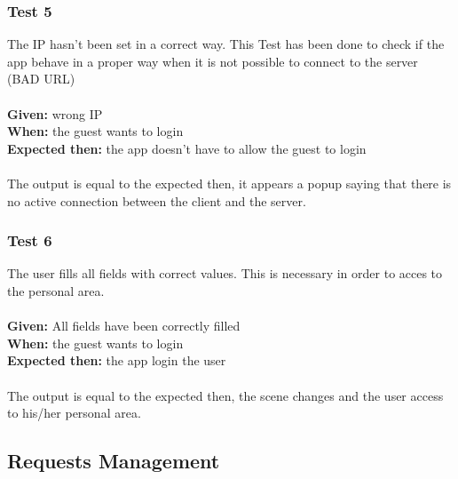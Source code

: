 \subsubsection{\Large{Test 5}}
The IP hasn't been set in a correct way. This Test has been done to check if the app behave in a proper way when it is not possible to connect to the server (BAD URL)\\
\\
\textbf{Given: } wrong IP\\
\textbf{When: } the guest wants to login\\
\textbf{Expected then: } the app doesn't have to allow the guest to login\\
\\
The output is equal to the expected then, it appears a popup saying that there is no active connection between the client and the server.

\subsubsection{\Large{Test 6}}
The user fills all fields with correct values. This is necessary in order to acces to the personal area.\\
\\
\textbf{Given: } All fields have been correctly filled\\
\textbf{When: } the guest wants to login\\
\textbf{Expected then: } the app login the user\\
\\
The output is equal to the expected then, the scene changes and the user access to his/her personal area.

\subsection{Requests Management}

